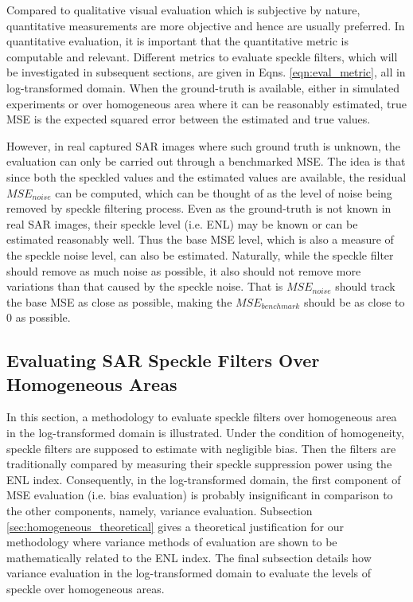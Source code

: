 Compared to qualitative visual evaluation which is subjective by nature,
  quantitative measurements are more objective and hence are usually preferred.
In quantitative evaluation, it is important that the quantitative metric is computable and relevant.
Different metrics to evaluate speckle filters, which will be investigated in subsequent sections, 
are given in Eqns. \ref{eqn:eval_metric}, all in log-transformed domain.
When the ground-truth is available, 
	either in simulated experiments or over homogeneous area where it can be reasonably estimated, 
	true MSE is the expected squared error between the estimated and true values.

However, in real captured SAR images where such ground truth is unknown,
  the evaluation can only be carried out through a benchmarked MSE. 
The idea is that since both the speckled values and the estimated values are available, the residual $MSE_{noise}$ 
can be computed, which can be thought of as the level of noise being removed by speckle filtering process.
Even as the ground-truth is not known in real SAR images, their speckle level (i.e. ENL) may be known or can be 
estimated reasonably well.
Thus the base MSE level, which is also a measure of the speckle noise level, can also be estimated.
Naturally, while the speckle filter should remove as much noise as possible, 
	it also should not remove more variations than that caused by the speckle noise.
That is $MSE_{noise}$ should track the base MSE as close as possible,
  making the $MSE_{benchmark}$ should be as close to 0 as possible.
        
\subsection{Evaluating SAR Speckle Filters Over Homogeneous Areas}
        

In this section, a methodology to evaluate speckle filters over homogeneous area in the log-transformed domain is 
illustrated. Under the condition of homogeneity, speckle filters are supposed to estimate with negligible bias.
Then the filters are traditionally compared by measuring their speckle suppression power using the ENL index.
Consequently, in the log-transformed domain, the first component of MSE evaluation (i.e. bias evaluation) is 
probably insignificant in comparison to the other components, namely, variance evaluation. 
Subsection \ref{sec:homogeneous_theoretical} gives a theoretical justification for our methodology where variance 
methods of evaluation are shown to be mathematically related to the ENL index.
The final subsection details how variance evaluation in the log-transformed domain to evaluate the levels of speckle 
over homogeneous areas.

